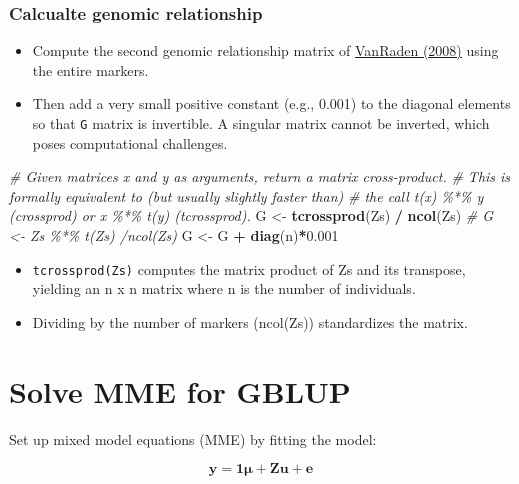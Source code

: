 \documentclass[
]{article}
\newenvironment{Shaded}{\begin{snugshade}}{\end{snugshade}}
\newcommand{\CommentTok}[1]{\textcolor[rgb]{0.56,0.35,0.01}{\textit{#1}}}
\newcommand{\FloatTok}[1]{\textcolor[rgb]{0.00,0.00,0.81}{#1}}
\newcommand{\FunctionTok}[1]{\textcolor[rgb]{0.13,0.29,0.53}{\textbf{#1}}}
\newcommand{\NormalTok}[1]{#1}
\newcommand{\OtherTok}[1]{\textcolor[rgb]{0.56,0.35,0.01}{#1}}
\newcommand{\SpecialCharTok}[1]{\textcolor[rgb]{0.81,0.36,0.00}{\textbf{#1}}}
\providecommand{\tightlist}{%
  \setlength{\itemsep}{0pt}\setlength{\parskip}{0pt}}
\begin{document}
\subsubsection{Calcualte genomic
relationship}\label{calcualte-genomic-relationship}

\begin{itemize}
\tightlist
\item
  Compute the second genomic relationship matrix of
  \href{https://www.ncbi.nlm.nih.gov/pubmed/18946147}{VanRaden (2008)}
  using the entire markers.
\item
  Then add a very small positive constant (e.g., 0.001) to the diagonal
  elements so that \texttt{G} matrix is invertible. A singular matrix
  cannot be inverted, which poses computational challenges.
\end{itemize}

\begin{Shaded}
\begin{Highlighting}[]
\CommentTok{\# Given matrices x and y as arguments, return a matrix cross{-}product. }
\CommentTok{\# This is formally equivalent to (but usually slightly faster than) }
\CommentTok{\# the call t(x) \%*\% y (crossprod) or x \%*\% t(y) (tcrossprod).}
\NormalTok{G }\OtherTok{\textless{}{-}} \FunctionTok{tcrossprod}\NormalTok{(Zs) }\SpecialCharTok{/} \FunctionTok{ncol}\NormalTok{(Zs)}
\CommentTok{\# G \textless{}{-} Zs \%*\% t(Zs) /ncol(Zs)}
\NormalTok{G }\OtherTok{\textless{}{-}}\NormalTok{ G }\SpecialCharTok{+} \FunctionTok{diag}\NormalTok{(n)}\SpecialCharTok{*}\FloatTok{0.001}
\end{Highlighting}
\end{Shaded}

\begin{itemize}
\tightlist
\item
  \texttt{tcrossprod(Zs)} computes the matrix product of Zs and its
  transpose, yielding an n x n matrix where n is the number of
  individuals.
\item
  Dividing by the number of markers (ncol(Zs)) standardizes the matrix.
\end{itemize}

\section{Solve MME for GBLUP}\label{solve-mme-for-gblup}

Set up mixed model equations (MME) by fitting the model:

\[\mathbf{y = 1\mu + Zu + e}\]
\end{document}
